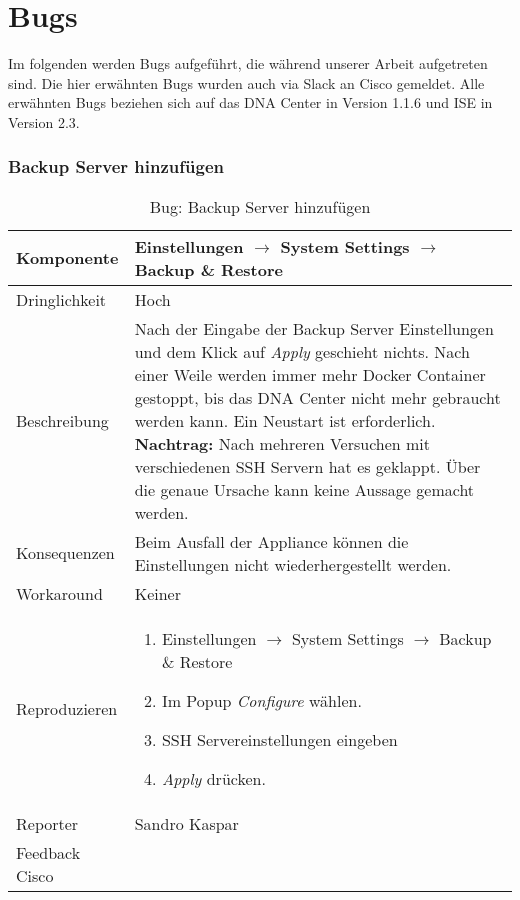 \section{Bugs}
Im folgenden werden Bugs aufgeführt, die während unserer Arbeit aufgetreten sind. Die hier erwähnten Bugs wurden auch via Slack an Cisco gemeldet. Alle erwähnten Bugs beziehen sich auf das DNA Center in Version 1.1.6 und ISE in Version 2.3.

\newcommand{\bugreport}[9]{
\subsubsection{#1}
	\begin{table}[H]
		\rowcolors{2}{gray!25}{white}
		\centering
		\begin{tabularx}{\textwidth}{| l | X |}
			\hline
			Komponente   & #2       \\
			\hline
			Dringlichkeit   & #3       \\
			\hline
			Beschreibung   & #4  \\ 
			\hline
			Konsequenzen   & #5  \\ 
			\hline
			Workaround & #6 \\
			\hline
			Reproduzieren & #7	\\
			\hline
			Reporter  & #8 \\
			\hline
			Feedback Cisco & #9 \\
			\hline
		\end{tabularx}
		\caption{Bug: #1}
	\end{table}
}

\bugreport
{Backup Server hinzufügen}
{Einstellungen $\rightarrow$ System Settings $\rightarrow$ Backup \& Restore}
{Hoch}
{Nach der Eingabe der Backup Server Einstellungen und dem Klick auf \textit{Apply} geschieht nichts. Nach einer Weile werden immer mehr Docker Container gestoppt, bis das DNA Center nicht mehr gebraucht werden kann. Ein Neustart ist erforderlich.
\textbf{Nachtrag:} Nach mehreren Versuchen mit verschiedenen SSH Servern hat es geklappt. Über die genaue Ursache kann keine Aussage gemacht werden.
}
{Beim Ausfall der Appliance können die Einstellungen nicht wiederhergestellt werden.}
{Keiner}
{
	\begin{enumerate}
		\item Einstellungen $\rightarrow$ System Settings $\rightarrow$ Backup \& Restore
		\item Im Popup \textit{Configure} wählen. 
		\item SSH Servereinstellungen eingeben
		\item \textit{Apply} drücken. 
	\end{enumerate}
}
{Sandro Kaspar}
{}

